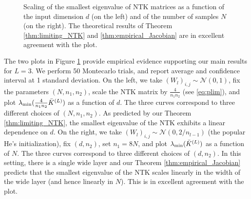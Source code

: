 \documentclass[11pt]{article}
\begin{document}
\begin{figure}[t]
    \centering
    \hspace{3em}
\caption{Scaling of the smallest eigenvalue of NTK matrices as a function of the input dimension $d$ (on the left) and of the number of samples $N$ (on the right). The theoretical results of Theorem \ref{thm:limiting_NTK} and \ref{thm:empirical_Jacobian} are in excellent agreement with the plot.}\label{fig:jac}

\end{figure}



The two plots in Figure \ref{fig:jac} provide empirical evidence supporting our main results for $L=3$. We perform 50 Montecarlo trials, and report average and confidence interval at 1 standard deviation. On the left, we take $(W_l)_{i, j}\sim \mathcal N(0, 1)$, fix the parameters $(N, n_1, n_2)$, scale the NTK matrix by $\frac{4}{n_1 n_2}$ (see \eqref{eq:plim}), and plot $\lambda_{\rm min}(\frac{4}{n_1 n_2}\bar{K}^{(L)})$ as a function of $d$.  The three curves correspond to three different choices of $(N, n_1, n_2)$. As predicted by our Theorem \ref{thm:limiting_NTK}, the smallest eigenvalue of the NTK exhibits a linear dependence on $d$. On the right, we take $(W_l)_{i, j}\sim \mathcal N(0, 2/n_{l-1})$ (the popular He's initialization), fix $(d, n_2)$, set $n_1=8N$, and plot $\lambda_{\rm min}(\bar{K}^{(L)})$ as a function of $N$. The three curves correspond to three different choices of $(d, n_2)$. In this setting, there is a single wide layer and our Theorem \ref{thm:empirical_Jacobian} predicts that the smallest eigenvalue of the NTK scales linearly in the width of the wide layer (and hence linearly in $N$). This is in excellent agreement with the plot.
\end{document}
